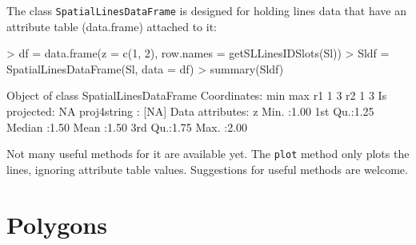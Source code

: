 \documentclass{article}
\begin{document}
The class {\tt SpatialLinesDataFrame} is designed for holding
lines data that have an attribute table (data.frame) attached
to it:
\begin{Schunk}
\begin{Sinput}
> df = data.frame(z = c(1, 2), row.names = getSLLinesIDSlots(Sl))
> Sldf = SpatialLinesDataFrame(Sl, data = df)
> summary(Sldf)
\end{Sinput}
\begin{Soutput}
Object of class SpatialLinesDataFrame
Coordinates:
   min max
r1   1   3
r2   1   3
Is projected: NA 
proj4string : [NA]
Data attributes:
       z       
 Min.   :1.00  
 1st Qu.:1.25  
 Median :1.50  
 Mean   :1.50  
 3rd Qu.:1.75  
 Max.   :2.00  

\end{Soutput}
\end{Schunk}
Not many useful methods for it are available yet.  The {\tt plot} method
only plots the lines, ignoring attribute table values. Suggestions for
useful methods are welcome.

\section{Polygons}
\end{document}

